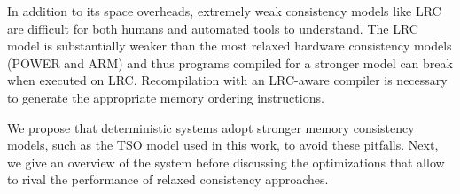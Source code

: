  In addition to its space overheads, extremely weak consistency models like LRC are difficult for both humans \cite{adve_data_2010} and automated tools \cite{batty_mathematizing_2011,burckhardt_checkfence:_2007} to understand. The LRC model is substantially weaker than the most relaxed hardware consistency models (POWER and ARM) and thus programs compiled for a stronger model can break when executed on LRC. Recompilation with an LRC-aware compiler is necessary to generate the appropriate memory ordering instructions.

We propose that deterministic systems adopt stronger memory consistency models, such as the TSO model used in this work, to avoid these pitfalls. Next, we give an overview of the \lib system before discussing the optimizations that allow \lib to rival the performance of relaxed consistency approaches.



